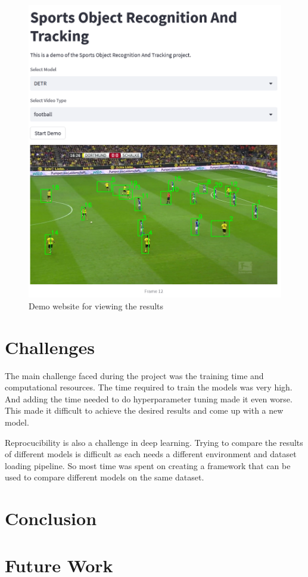 \documentclass[runningheads]{llncs}
\begin{document}
\begin{figure}
    \centering
    \includegraphics[width=\textwidth,height=13cm,keepaspectratio]{images/sport_demo.png}
    \caption{Demo website for viewing the results}
    \label{fig:sport_demo}
\end{figure}


\section{Challenges}

The main challenge faced during the project was the training time and computational resources.
The time required to train the models was very high.
And adding the time needed to do hyperparameter tuning made it even worse.
This made it difficult to achieve the desired results and come up with a new model.

Reprocucibility is also a challenge in deep learning.
Trying to compare the results of different models is difficult as each needs a different environment and dataset loading pipeline.
So most time was spent on creating a framework that can be used to compare different models on the same dataset.

\section{Conclusion}

\section{Future Work}


%
%


\nocite{*}
\end{document}
